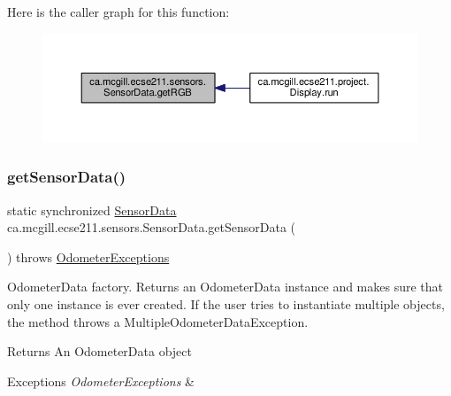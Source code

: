 Here is the caller graph for this function\+:
\nopagebreak
\begin{figure}[H]
\begin{center}
\leavevmode
\includegraphics[width=350pt]{classca_1_1mcgill_1_1ecse211_1_1sensors_1_1_sensor_data_a0abd08431dae67c7ee0e7a18b5305f91_icgraph}
\end{center}
\end{figure}
\mbox{\label{classca_1_1mcgill_1_1ecse211_1_1sensors_1_1_sensor_data_ab8aef4bdb5d9f3dad399656e00af2539}} 
\subsubsection{\texorpdfstring{get\+Sensor\+Data()}{getSensorData()}}
{\footnotesize\ttfamily static synchronized \hyperlink{classca_1_1mcgill_1_1ecse211_1_1sensors_1_1_sensor_data}{Sensor\+Data} ca.\+mcgill.\+ecse211.\+sensors.\+Sensor\+Data.\+get\+Sensor\+Data (\begin{DoxyParamCaption}{ }\end{DoxyParamCaption}) throws \hyperlink{classca_1_1mcgill_1_1ecse211_1_1odometer_1_1_odometer_exceptions}{Odometer\+Exceptions}\hspace{0.3cm}{\ttfamily [static]}}

Odometer\+Data factory. Returns an Odometer\+Data instance and makes sure that only one instance is ever created. If the user tries to instantiate multiple objects, the method throws a Multiple\+Odometer\+Data\+Exception.

\begin{DoxyReturn}{Returns}
An Odometer\+Data object 
\end{DoxyReturn}

\begin{DoxyExceptions}{Exceptions}
{\em Odometer\+Exceptions} & \\
\hline
\end{DoxyExceptions}


